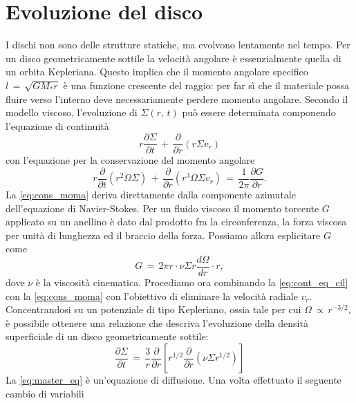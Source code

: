 \section{Evoluzione del disco}

I dischi non sono delle strutture statiche, ma evolvono lentamente nel tempo. Per un disco geometricamente sottile la velocità angolare è essenzialmente quella di un orbita Kepleriana. 
Questo implica che il momento angolare specifico $l\,=\,\sqrt{GM_\ast r}$ è una funzione crescente del raggio: per far sì che il materiale possa fluire verso l'interno deve necessariamente perdere momento angolare. Secondo il modello viscoso, l'evoluzione di $\Sigma\left(r,\,t\right)$ può essere determinata \parencite{Pringle1981} componendo l'equazione di continuità
\begin{equation}
r\frac{\partial\Sigma}{\partial t}\,+\,\frac{\partial}{\partial r}\left(r\Sigma v_r\right)
\label{eq:cont_eq_cil}
\end{equation}
con l'equazione per la conservazione del momento angolare
\begin{equation}
r\frac{\partial}{\partial t}\left(r^2\Omega\Sigma\right)\,+\,\frac{\partial}{\partial r}\left(r^3\Omega\Sigma v_r\right)\,=\,\frac{1}{2\pi}\frac{\partial G}{\partial r}.
\label{eq:cons_moma}
\end{equation}
La \eqref{eq:cons_moma} deriva direttamente dalla componente azimutale dell'equazione di Navier-Stokes.
Per un fluido viscoso il momento torcente $G$ applicato su un anellino è dato dal prodotto fra la circonferenza, la forza viscosa per unità di lunghezza ed il braccio della forza. Possiamo allora esplicitare $G$ come
\begin{equation}
G\,=\,2\pi r \cdot \nu\Sigma r \frac{d\Omega}{dr} \cdot r,
\label{eq:torque_vis}
\end{equation}
dove $\nu$ è la viscosità cinematica. Procediamo ora combinando la \eqref{eq:cont_eq_cil} con la \eqref{eq:cons_moma} con l'obiettivo di eliminare la velocità radiale $v_r$. Concentrandosi su un potenziale di tipo Kepleriano, ossia tale per cui $\Omega\,\propto\,r^{-3/2}$, è possibile ottenere una relazione che descriva l'evoluzione della densità superficiale di un disco geometricamente sottile:
\begin{equation}
\frac{\partial \Sigma}{\partial t}\,=\,\frac{3}{r}\frac{\partial}{\partial r}\left[r^{1/2} \frac{\partial}{\partial r}\left(\nu\Sigma r^{1/2}\right)\right]
\label{eq:master_eq}
\end{equation}
La \eqref{eq:master_eq} è un'equazione di diffusione. Una volta effettuato il seguente cambio di variabili
